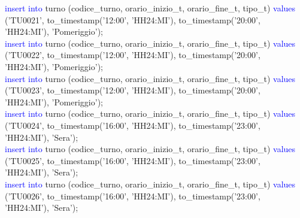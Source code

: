 \documentclass{article}
\begin{document}
\begin{flushleft}
{        \hspace*{0.5em}\textcolor{blue}{insert into} turno (codice\_turno, orario\_inizio\_t, orario\_fine\_t, tipo\_t) \textcolor{blue}{values} \hspace*{0.5em}('TU0021', to\_timestamp('12:00', 'HH24:MI'), to\_timestamp('20:00', 'HH24:MI'), \hspace*{0.5em}'Pomeriggio'); \\
        \hspace*{0.5em}\textcolor{blue}{insert into} turno (codice\_turno, orario\_inizio\_t, orario\_fine\_t, tipo\_t) \textcolor{blue}{values} \hspace*{0.5em}('TU0022', to\_timestamp('12:00', 'HH24:MI'), to\_timestamp('20:00', 'HH24:MI'), \hspace*{0.5em}'Pomeriggio'); \\
        \newpage
        \hspace*{0.5em}\textcolor{blue}{insert into} turno (codice\_turno, orario\_inizio\_t, orario\_fine\_t, tipo\_t) \textcolor{blue}{values} \hspace*{0.5em}('TU0023', to\_timestamp('12:00', 'HH24:MI'), to\_timestamp('20:00', 'HH24:MI'), \hspace*{0.5em}'Pomeriggio'); \\
        \hspace*{0.5em}\textcolor{blue}{insert into} turno (codice\_turno, orario\_inizio\_t, orario\_fine\_t, tipo\_t) \textcolor{blue}{values} \hspace*{0.5em}('TU0024', to\_timestamp('16:00', 'HH24:MI'), to\_timestamp('23:00', 'HH24:MI'), \hspace*{0.5em}'Sera'); \\
        \hspace*{0.5em}\textcolor{blue}{insert into} turno (codice\_turno, orario\_inizio\_t, orario\_fine\_t, tipo\_t) \textcolor{blue}{values} \hspace*{0.5em}('TU0025', to\_timestamp('16:00', 'HH24:MI'), to\_timestamp('23:00', 'HH24:MI'), \hspace*{0.5em}'Sera'); \\
        \hspace*{0.5em}\textcolor{blue}{insert into} turno (codice\_turno, orario\_inizio\_t, orario\_fine\_t, tipo\_t) \textcolor{blue}{values} \hspace*{0.5em}('TU0026', to\_timestamp('16:00', 'HH24:MI'), to\_timestamp('23:00', 'HH24:MI'), \hspace*{0.5em}'Sera'); \\
}
\end{flushleft}
\end{document}
